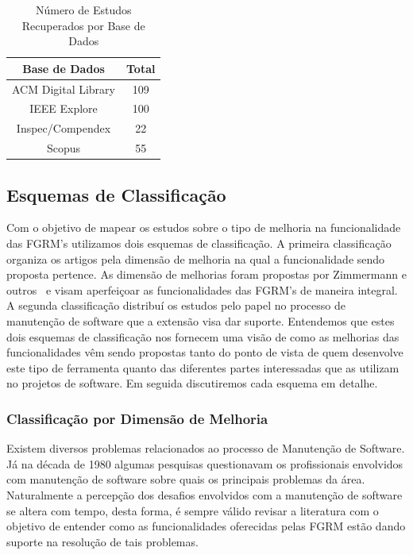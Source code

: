 \begin{table}[htb] \centering \caption{Número de Estudos Recuperados por Base de
		Dados}\label{tab:estudos-por-base-dados} \begin{tabular}{cc} \hline
		\textbf{Base de Dados} & \textbf{Total} \\ \hline ACM Digital Library
		& 109            \\ IEEE Explore           & 100            \\
		Inspec/Compendex       & 22             \\ Scopus                 & 55
		\\ \hline \end{tabular}

\end{table}

\subsection{Esquemas de Classificação}
\label{subsec:map-esquemas-classificacao}

Com o objetivo de mapear os estudos sobre o tipo de melhoria na funcionalidade
das FGRM's utilizamos dois esquemas de classificação. A primeira classificação
organiza os artigos pela dimensão de melhoria na qual a funcionalidade sendo
proposta pertence. As dimensão de melhorias foram propostas por Zimmermann e
outros~\cite{zimmermann2009improving} e visam aperfeiçoar as funcionalidades das
FGRM's de maneira integral. A segunda classificação distribuí os estudos pelo
papel no processo de manutenção de software que a extensão visa dar suporte.
Entendemos que estes dois esquemas de classificação  nos fornecem uma visão de
como as melhorias das funcionalidades vêm sendo propostas tanto do ponto de
vista de quem desenvolve este tipo de ferramenta quanto das diferentes partes
interessadas que as utilizam no projetos de software. Em seguida discutiremos
cada esquema em detalhe.

\subsubsection{Classificação por Dimensão de Melhoria} 
\label{subsubsec:map-esquema-suporte-problema}

Existem diversos problemas relacionados ao processo de Manutenção de Software.
Já na década de 1980 algumas pesquisas questionavam os profissionais envolvidos
com manutenção de software sobre quais os principais problemas da
área\cite{Lientz:1981:PAS:358790.358796}. Naturalmente a percepção dos desafios
envolvidos com a manutenção de software se altera com tempo, desta forma, é
sempre válido revisar a literatura com o objetivo de entender como as
funcionalidades oferecidas pelas FGRM estão dando suporte na resolução de tais
problemas.

